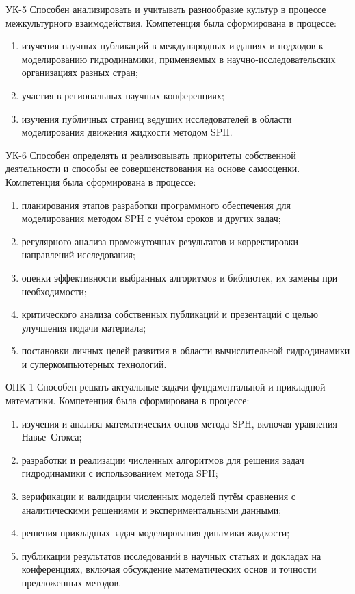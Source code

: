 УК-5 Способен анализировать и учитывать разнообразие культур в процессе межкультурного взаимодействия.
Компетенция была сформирована в процессе:
\begin{enumerate}
    \item изучения научных публикаций в международных изданиях и подходов к моделированию гидродинамики, 
        применяемых в научно-исследовательских организациях разных стран;
    \item участия в региональных научных конференциях;
    \item изучения публичных страниц ведущих исследователей в области моделирования движения жидкости методом SPH.
\end{enumerate}

УК-6 Способен определять и реализовывать приоритеты собственной деятельности и способы ее совершенствования на основе самооценки.
Компетенция была сформирована в процессе:
\begin{enumerate}
    \item планирования этапов разработки программного обеспечения для моделирования методом SPH с учётом сроков и других задач;
    \item регулярного анализа промежуточных результатов и корректировки направлений исследования;
    \item оценки эффективности выбранных алгоритмов и библиотек, их замены при необходимости;
    \item критического анализа собственных публикаций и презентаций с целью улучшения подачи материала;
    \item постановки личных целей развития в области вычислительной гидродинамики и суперкомпьютерных технологий.
\end{enumerate}

ОПК-1 Способен решать актуальные задачи фундаментальной и прикладной математики.
Компетенция была сформирована в процессе:
\begin{enumerate}
    \item изучения и анализа математических основ метода SPH, включая уравнения Навье–Стокса;
    \item разработки и реализации численных алгоритмов для решения задач гидродинамики с использованием метода SPH;
    \item верификации и валидации численных моделей путём сравнения с аналитическими решениями и экспериментальными данными;
    \item решения прикладных задач моделирования динамики жидкости;
    \item публикации результатов исследований в научных статьях и докладах на конференциях, 
        включая обсуждение математических основ и точности предложенных методов.
\end{enumerate}

